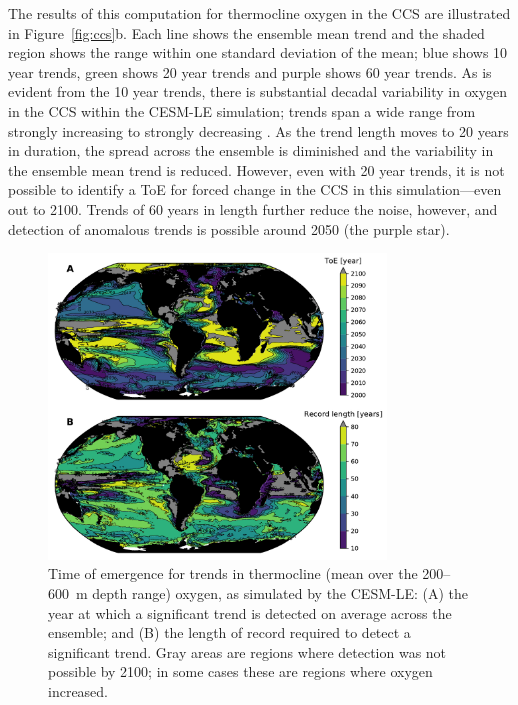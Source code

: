 \documentclass[draft,linenumbers]{report_chapter}
\begin{document}
The results of this computation for thermocline oxygen in the CCS are illustrated in Figure~\ref{fig:ccs}b.
Each line shows the ensemble mean trend and the shaded region shows the range within one standard deviation of the mean; blue shows 10 year trends, green shows 20 year trends and purple shows 60 year trends.
As is evident from the 10 year trends, there is substantial decadal variability in oxygen in the CCS within the CESM-LE simulation; trends span a wide range from strongly increasing to strongly decreasing .
As the trend length moves to 20 years in duration, the spread across the ensemble is diminished and the variability in the ensemble mean trend is reduced.
However, even with 20 year trends, it is not possible to identify a ToE for forced  change in the CCS in this simulation---even out to 2100.
Trends of 60 years in length further reduce the noise, however, and detection of anomalous trends is possible around 2050 (the purple star).

\begin{figure}[tbp]
\centering
\includegraphics[width=0.8\textwidth]{cesm-toe.pdf}
\caption{Time of emergence for trends in thermocline (mean over the 200--600~m depth range) oxygen, as simulated by the CESM-LE: (A) the year at which a significant trend is detected on average across the ensemble; and (B) the length of record required to detect a significant trend.
Gray areas are regions where detection was not possible by 2100; in some cases these are regions where oxygen increased.}
\label{fig:cesm-toe}
\end{figure}
\end{document}
